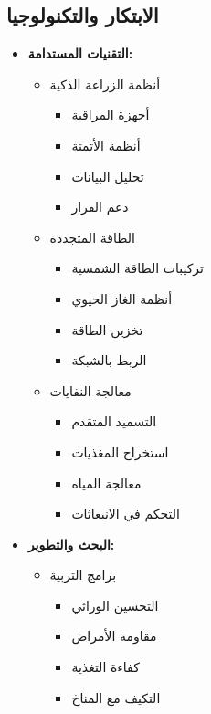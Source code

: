 \subsection{الابتكار والتكنولوجيا}
\begin{itemize}
    \item \textbf{التقنيات المستدامة:}
    \begin{itemize}
        \item أنظمة الزراعة الذكية
        \begin{itemize}
            \item أجهزة المراقبة
            \item أنظمة الأتمتة
            \item تحليل البيانات
            \item دعم القرار
        \end{itemize}
        
        \item الطاقة المتجددة
        \begin{itemize}
            \item تركيبات الطاقة الشمسية
            \item أنظمة الغاز الحيوي
            \item تخزين الطاقة
            \item الربط بالشبكة
        \end{itemize}
        
        \item معالجة النفايات
        \begin{itemize}
            \item التسميد المتقدم
            \item استخراج المغذيات
            \item معالجة المياه
            \item التحكم في الانبعاثات
        \end{itemize}
    \end{itemize}
    
    \item \textbf{البحث والتطوير:}
    \begin{itemize}
        \item برامج التربية
        \begin{itemize}
            \item التحسين الوراثي
            \item مقاومة الأمراض
            \item كفاءة التغذية
            \item التكيف مع المناخ
        \end{itemize}
        

\end{itemize}
\end{itemize}
